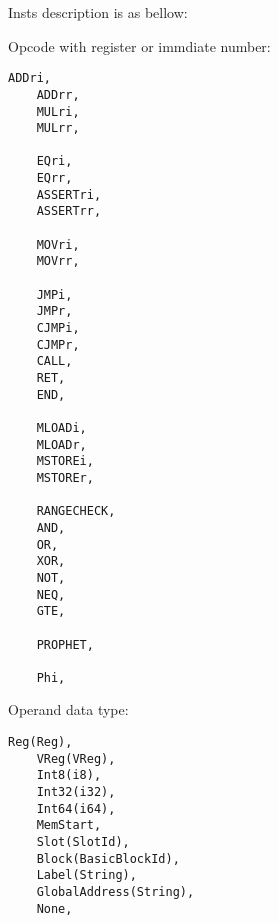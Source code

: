 \begin{itemize}
Insts description is as bellow:

Opcode with register or immdiate number:
\begin{lstlisting}[language={}]
    ADDri,
    ADDrr,
    MULri,
    MULrr,

    EQri,
    EQrr,
    ASSERTri,
    ASSERTrr,

    MOVri,
    MOVrr,

    JMPi,
    JMPr,
    CJMPi,
    CJMPr,
    CALL,
    RET,
    END,

    MLOADi,
    MLOADr,
    MSTOREi,
    MSTOREr,

    RANGECHECK,
    AND,
    OR,
    XOR,
    NOT,
    NEQ,
    GTE,

    PROPHET,

    Phi,
\end{lstlisting}

Operand data type:
\begin{lstlisting}[language={}]
    Reg(Reg),
    VReg(VReg),
    Int8(i8),
    Int32(i32),
    Int64(i64),
    MemStart,
    Slot(SlotId),
    Block(BasicBlockId),
    Label(String),
    GlobalAddress(String),
    None,
\end{lstlisting}

\end{itemize}